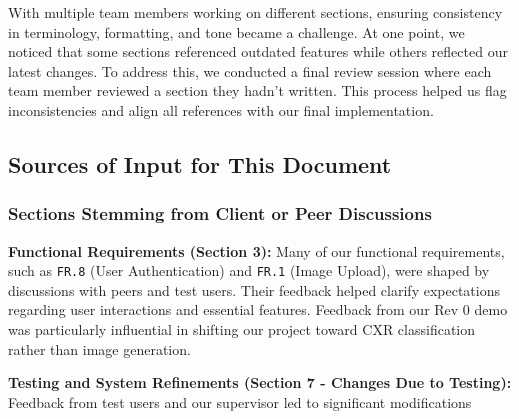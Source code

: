 \documentclass[12pt, titlepage]{article}
\begin{document}
\begin{enumerate}
  With multiple team members working on different sections, ensuring consistency in terminology, formatting, and tone became a challenge. At one point, we noticed that some sections referenced outdated features while others reflected our latest changes. To address this, we conducted a final review session where each team member reviewed a section they hadn’t written. This process helped us flag inconsistencies and align all references with our final implementation.
  
  \subsection{Sources of Input for This Document}
  
  \subsubsection{Sections Stemming from Client or Peer Discussions}
  
  \textbf{Functional Requirements (Section 3):} Many of our functional requirements, such as \texttt{FR.8} (User Authentication) and \texttt{FR.1} (Image Upload), were shaped by discussions with peers and test users. Their feedback helped clarify expectations regarding user interactions and essential features. Feedback from our Rev 0 demo was particularly influential in shifting our project toward CXR classification rather than image generation.
  
  \textbf{Testing and System Refinements (Section 7 - Changes Due to Testing):} Feedback from test users and our supervisor led to significant modifications 
  
  

\end{enumerate}
\end{document}
